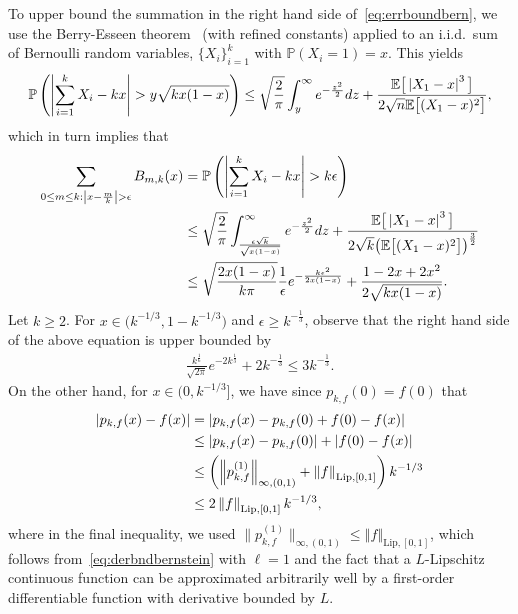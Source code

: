 \documentclass[a4paper,onecolumn,11pt,accepted=2026-05-12]{quantumarticle}
\newcommand{\norm}[1]{\left\Vert#1\right\Vert}
\newcommand{\abs}[1]{\left\vert#1\right\vert}
\newcommand{\EE}{\mathbb{E}}
\newcommand{\PP}{\mathbb{P}}
\begin{document}
To upper bound the summation in the right hand side of~\eqref{eq:errboundbern}, we use the Berry-Esseen theorem~\cite{Berry-41,Esseen-42} (with refined constants) applied to an i.i.d.~sum of Bernoulli random variables, $\{X_i\}_{i=1}^k$ with $\PP\!\left(X_i=1\right)=x$. This yields 
     \begin{align}
      \PP\left(  \abs{\sum_{i=1}^k X_i -kx}> y \sqrt{kx(1-x)}\right) \leq \sqrt{\frac{2}{\pi}} \int_{y}^{\infty} e^{-\frac{z^2}{2}}dz +\frac{\EE\big[\abs {X_1-x}^3 \big]}{2\sqrt{n} \EE \big[(X_1-x)^2\big]}, \notag
     \end{align}
     which in turn implies that
     \begin{align}
     \sum_{\substack{0 \leq m \leq k: \abs{x-\frac{m}{k}} > \epsilon   }}  B_{m,k}(x)&=\PP\left(  \abs{\sum_{i=1}^k X_i -kx}> k \epsilon\right)    \notag \\
     &\leq \sqrt{\frac{2}{\pi}} \int_{\frac{\epsilon \sqrt{k}}{\sqrt{x(1-x)}}}^{\infty} e^{-\frac{z^2}{2}}dz +\frac{\EE\big[\abs {X_1-x}^3 \big]}{2\sqrt{k} \big(\EE \big[(X_1-x)^2\big]\big)^{\frac 32}} \notag \\
     &\leq \sqrt{\frac{2x(1-x)}{k\pi}} \frac{1}{\epsilon} e^{-\frac{k \epsilon^2}{2x(1-x)}} +\frac{1-2x+2x^2}{2\sqrt{kx(1-x)}}.\notag 
     \end{align}
  Let $k \geq 2$.    For $x \in \big(k^{-1/3},1-k^{-1/3}\big)$ and $\epsilon \geq k^{-\frac 13}$, observe that the right hand side of the above equation is upper bounded by
     \begin{align}
         \frac{k^{\frac 16}}{\sqrt{2\pi }}e^{-2k^{\frac 13}}+2 k^{-\frac 13} \leq 3k^{-\frac 13}. \label{approxsum1}
     \end{align}
     On the other hand, for $x \in (0,k^{-1/3}] $, we have since $p_{k,f}(0)=f(0)$ that
     \begin{align}
    \abs{p_{k,f}(x)-f(x)} & = \abs{p_{k,f}(x)-p_{k,f}(0)+f(0)-f(x)} \notag \\
    &\leq \abs{p_{k,f}(x)-p_{k,f}(0)}+\abs{f(0)-f(x)} \notag \\
    &\leq \left( \norm{p_{k,f}^{(1)}}_{\infty,(0,1)}+\norm{f}_{\mathrm{Lip},[0,1]}  \right)k^{-1/3} \notag \\
    & \leq 2 \norm{f}_{\mathrm{Lip},[0,1]}  k^{-1/3},\label{approxsum2}
     \end{align}
  where in the final inequality, we used $\big\|p_{k,f}^{(1)}\big\|_{\infty,(0,1)} \leq \norm{f}_{\mathrm{Lip},[0,1]}$, which follows from~\eqref{eq:derbndbernstein} with $\ell=1$ and the fact that a $L$-Lipschitz continuous function can be approximated arbitrarily well by a first-order differentiable function with derivative bounded by $L$. 
\end{document}
